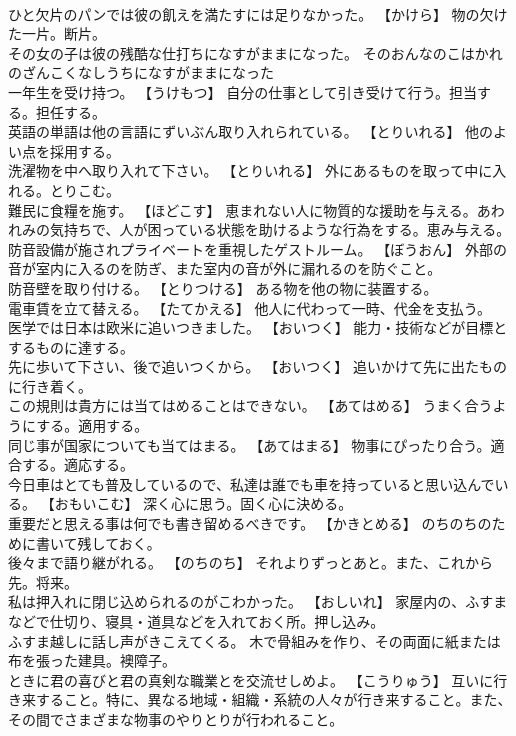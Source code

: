 \documentclass[8pt]{extreport}
\begin{document}
\begin{CJK}{UTF8}{min}
\\	ひと欠片のパンでは彼の飢えを満たすには足りなかった。	【かけら】 物の欠けた一片。断片。
\\	その女の子は彼の残酷な仕打ちになすがままになった。	そのおんなのこはかれのざんこくなしうちになすがままになった 
\\	一年生を受け持つ。	【うけもつ】 自分の仕事として引き受けて行う。担当する。担任する。
\\	英語の単語は他の言語にずいぶん取り入れられている。	【とりいれる】 他のよい点を採用する。
\\	洗濯物を中へ取り入れて下さい。	【とりいれる】 外にあるものを取って中に入れる。とりこむ。
\\	難民に食糧を施す。	【ほどこす】 恵まれない人に物質的な援助を与える。あわれみの気持ちで、人が困っている状態を助けるような行為をする。恵み与える。
\\	防音設備が施されプライベートを重視したゲストルーム。	【ぼうおん】 外部の音が室内に入るのを防ぎ、また室内の音が外に漏れるのを防ぐこと。
\\	防音壁を取り付ける。	【とりつける】 ある物を他の物に装置する。
\\	電車賃を立て替える。	【たてかえる】 他人に代わって一時、代金を支払う。
\\	医学では日本は欧米に追いつきました。	【おいつく】 能力・技術などが目標とするものに達する。
\\	先に歩いて下さい、後で追いつくから。	【おいつく】 追いかけて先に出たものに行き着く。
\\	この規則は貴方には当てはめることはできない。	【あてはめる】 うまく合うようにする。適用する。
\\	同じ事が国家についても当てはまる。	【あてはまる】 物事にぴったり合う。適合する。適応する。
\\	今日車はとても普及しているので、私達は誰でも車を持っていると思い込んでいる。	【おもいこむ】 深く心に思う。固く心に決める。
\\	重要だと思える事は何でも書き留めるべきです。	【かきとめる】 のちのちのために書いて残しておく。
\\	後々まで語り継がれる。	【のちのち】 それよりずっとあと。また、これから先。将来。
\\	私は押入れに閉じ込められるのがこわかった。	【おしいれ】 家屋内の、ふすまなどで仕切り、寝具・道具などを入れておく所。押し込み。
\\	ふすま越しに話し声がきこえてくる。	木で骨組みを作り、その両面に紙または布を張った建具。襖障子。
\\	ときに君の喜びと君の真剣な職業とを交流せしめよ。	【こうりゅう】 互いに行き来すること。特に、異なる地域・組織・系統の人々が行き来すること。また、その間でさまざまな物事のやりとりが行われること。

\end{CJK}
\end{document}
